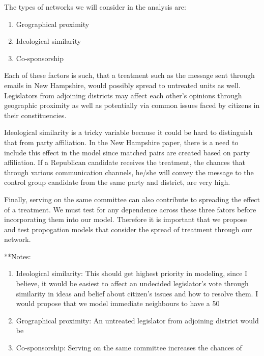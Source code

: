 \documentclass[12pt]{article}
\begin{document}
The types of networks we will consider in the analysis are: \\

\begin{enumerate}

\item Grographical proximity
\item Ideological similarity
\item Co-sponsorship

\end{enumerate}

Each of these factors is such, that a treatment such as the message sent through emails in New Hampshire, would possibly spread to untreated units as well. Legislators from adjoining districts may affect each other's opinions through geographic proximity as well as potentially via common issues faced by citizens in their constituencies.

Ideological similarity is a tricky variable because it could be hard to distinguish that from party affiliation. In the New Hampshire paper, there is a need to include this effect in the model since matched pairs are created based on party affiliation. If a Republican candidate receives the treatment, the chances that through various communication channels, he/she will convey the message to the control group candidate from the same party and district, are very high.

Finally, serving on the same committee can also contribute to spreading the effect of a treatment. We must test for any dependence across these three fators before incorporating them into our model. Therefore it is important that we propose and test propogation models that consider the spread of treatment through our network.


**Notes:
\begin{enumerate}

\item Ideological similarity: This should get highest priority in modeling, since I believe, it would be easiest to affect an undecided legislator's vote through similarity in ideas and belief about citizen's issues and how to resolve them. I would propose that we model immediate neighbours to have a 50%
\item Grographical proximity: An untreated legislator from adjoining district would be 
\item Co-sponsorship: Serving on the same committee increases the chances of 

\end{enumerate}
\end{document}
